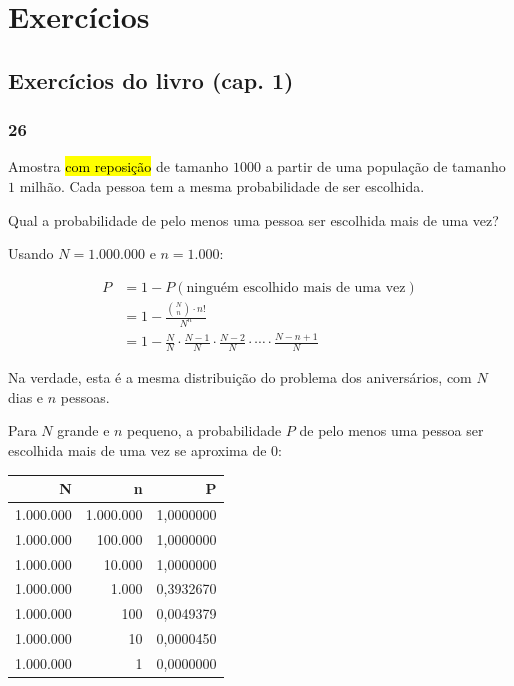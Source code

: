 \documentclass[
  11pt]{report}
\begin{document}
\hypertarget{exercuxedcios-2}{%
\section*{Exercícios}\label{exercuxedcios-2}}

\hypertarget{exercuxedcios-do-livro-cap.-1-2}{%
\subsection*{Exercícios do livro (cap. 1)}\label{exercuxedcios-do-livro-cap.-1-2}}

\hypertarget{section-5}{%
\subsubsection*{26}\label{section-5}}

\begin{rmdbox}
Amostra {\hl{com reposição}} de tamanho $1000$ a partir de uma população de tamanho $1$ milhão. Cada pessoa tem a mesma probabilidade de ser escolhida.

Qual a probabilidade de pelo menos uma pessoa ser escolhida mais de uma vez?

\end{rmdbox}

Usando $N = 1.000.000$ e $n = 1.000$:

\[
\begin{aligned}
P &= 1 - P(\text{ninguém escolhido mais de uma vez}) \\
  &= 1 - \frac{\binom{N}{n} \cdot n!}{N^n} \\
  &= 1 - \frac{N}{N} \cdot \frac{N - 1}{N} \cdot \frac{N - 2}{N} \cdot \cdots \cdot \frac{N - n + 1}{N}
\end{aligned}
\]

Na verdade, esta é a mesma distribuição do problema dos aniversários, com $N$ dias e $n$ pessoas.

Para $N$ grande e $n$ pequeno, a probabilidade $P$ de pelo menos uma pessoa ser escolhida mais de uma vez se aproxima de $0$:

\begin{table}
\centering
\begin{tabular}[t]{r|r|r}
\hline
N & n & P\\
\hline
1.000.000 & 1.000.000 & 1,0000000\\
\hline
1.000.000 & 100.000 & 1,0000000\\
\hline
1.000.000 & 10.000 & 1,0000000\\
\hline
1.000.000 & 1.000 & 0,3932670\\
\hline
1.000.000 & 100 & 0,0049379\\
\hline
1.000.000 & 10 & 0,0000450\\
\hline
1.000.000 & 1 & 0,0000000\\
\hline
\end{tabular}
\end{table}
\end{document}
